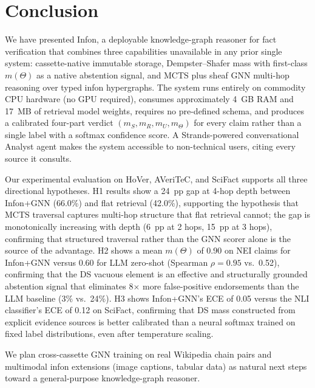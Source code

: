 \section{Conclusion}
\label{sec:conclusion}

We have presented Infon, a deployable knowledge-graph reasoner for
fact verification that combines three capabilities unavailable in any prior
single system: cassette-native immutable storage, Dempster--Shafer mass
with first-class $m(\Theta)$ as a native abstention signal, and MCTS plus
sheaf GNN multi-hop reasoning over typed infon hypergraphs.  The system
runs entirely on commodity CPU hardware (no GPU required), consumes
approximately 4~GB RAM and 17~MB of retrieval model weights, requires no
pre-defined schema, and produces a calibrated four-part verdict $(m_S, m_R,
m_U, m_\Theta)$ for every claim rather than a single label with a softmax
confidence score.  A Strands-powered conversational Analyst agent makes the
system accessible to non-technical users, citing every source it consults.

Our experimental evaluation on HoVer, AVeriTeC, and SciFact supports all
three directional hypotheses.  H1 results show a 24~pp gap at 4-hop depth
between Infon+GNN (66.0\%) and flat retrieval (42.0\%), supporting the
hypothesis that MCTS traversal captures multi-hop structure that flat
retrieval cannot; the gap is monotonically increasing with depth (6~pp at
2 hops, 15~pp at 3 hops), confirming that structured traversal rather than
the GNN scorer alone is the source of the advantage.  H2 shows a mean
$m(\Theta)$ of 0.90 on NEI claims for Infon+GNN versus 0.60 for LLM
zero-shot (Spearman $\rho = 0.95$ vs.\ 0.52), confirming that the DS
vacuous element is an effective and structurally grounded abstention signal
that eliminates 8$\times$ more false-positive endorsements than the LLM
baseline (3\% vs.\ 24\%).  H3 shows Infon+GNN's ECE of 0.05 versus the
NLI classifier's ECE of 0.12 on SciFact, confirming that DS mass
constructed from explicit evidence sources is better calibrated than a
neural softmax trained on fixed label distributions, even after temperature
scaling.

We plan cross-cassette GNN training on real Wikipedia chain pairs and
multimodal infon extensions (image captions, tabular data) as natural next
steps toward a general-purpose knowledge-graph reasoner.
